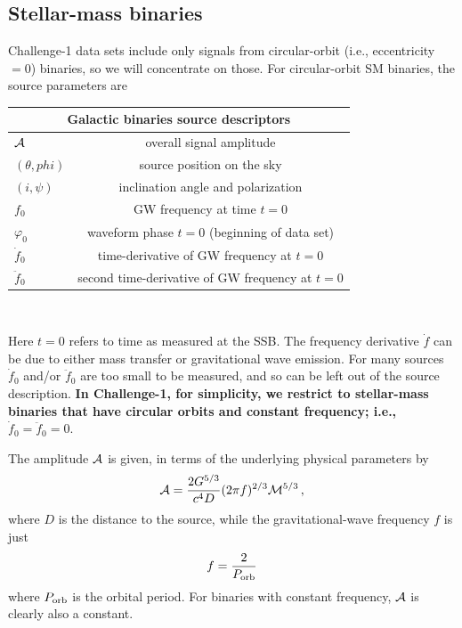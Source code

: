 \documentclass[11pt]{report}
\begin{document}
\subsection{Stellar-mass binaries}
Challenge-1 data sets include only signals from circular-orbit (i.e., eccentricity $= 0$) binaries, so we will concentrate on those. 
For circular-orbit SM binaries, the source parameters are

\begin{center}
\begin{tabular}{l|c}
\hline \hline
\multicolumn{2}{c}{{\bf Galactic binaries source descriptors}} \\
\hline
\hline
${\cal A}$ & overall signal amplitude\\
$(\theta, phi)$ & source position on the sky\\
$(i,\psi)$ & inclination angle and polarization\\
$f_0$    & GW frequency at time $t=0$ \\ 
$\varphi_0$ &  waveform phase $t=0$ (beginning of data set)\\
$\dot{f}_0$ & time-derivative of GW frequency at $t=0$\\
$\ddot{f}_0$ & second time-derivative of GW frequency at $t=0$ \\
\hline \hline
\end{tabular} \\
\end{center}

Here $t=0$ refers to time as measured at the SSB. 
The frequency derivative $\dot{f}$ can be due to either mass transfer or gravitational wave emission.
For many sources 
$\dot{f}_0$ and/or $\ddot{f}_0$ are too small to be measured, and so can 
be left out of the source description. 
{\bf In Challenge-1, for simplicity, we restrict to stellar-mass binaries that have circular orbits and constant frequency; i.e., $\dot f_0 = \ddot f_0 =0$}.

The amplitude ${\cal A}$ is given, in terms of the underlying physical parameters by
\begin{equation}\label{amp}
{\cal A} = {{2G^{5/3}}\over{c^4 D}}(2\pi f)^{2/3} {\cal M}^{5/3} \, , 
\end{equation}
where $D$ is the distance to the source, while the gravitational-wave frequency $f$ is just
\begin{equation}\label{freq}
f  = {{2}\over{P_{\rm orb}}}
\end{equation}
where $P_{\rm orb}$ is the orbital period.
For binaries with constant frequency, ${\cal A}$ is clearly also a constant.
\end{document}

